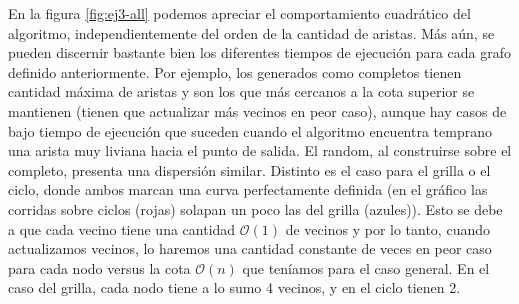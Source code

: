 En la figura \ref{fig:ej3-all} podemos apreciar el comportamiento cuadrático del algoritmo, independientemente del orden de la cantidad de aristas. Más aún, se pueden discernir bastante bien
los diferentes tiempos de ejecución para cada grafo definido anteriormente. Por ejemplo, los generados como completos tienen cantidad máxima de aristas y son los que más cercanos a la cota superior se mantienen (tienen que actualizar más vecinos en peor caso), aunque hay casos de bajo tiempo de ejecución que suceden cuando el algoritmo encuentra temprano una arista muy liviana hacia el punto de salida. El random, al construirse sobre el completo, presenta una dispersión similar. Distinto es el caso para el grilla o el ciclo, donde ambos marcan una curva perfectamente definida (en el gráfico las corridas sobre ciclos (rojas) solapan un poco las del grilla (azules)). Esto se debe a que cada vecino tiene una cantidad $\mathcal{O}(1)$ de vecinos y por lo tanto, cuando actualizamos vecinos, lo haremos una cantidad constante de veces en peor caso para cada nodo versus la cota $\mathcal{O}(n)$ que teníamos para el caso general. En el caso del grilla, cada nodo tiene a lo sumo 4 vecinos, y en el ciclo tienen 2.
